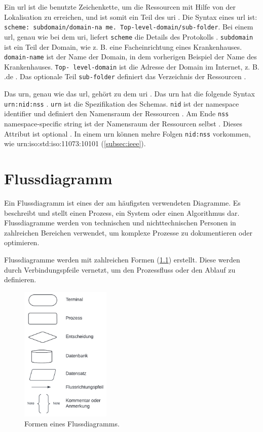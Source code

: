  Ein \acf{url} ist die benutzte Zeichenkette, um die Ressourcen mit Hilfe von der Lokalisation zu erreichen, und ist somit ein Teil des \ac{uri} \cite{uribibdiff2}. Die Syntax eines \ac{url} ist: \texttt{scheme: subdomain/domain-na me. Top-level-domain/sub-folder}. Bei einem \ac{url}, genau wie bei dem \ac{uri}, liefert \texttt{scheme} die Details des Protokolls \cite{uribibdiff}. \texttt{subdomain} ist ein Teil der Domain, wie z. B. eine Facheinrichtung eines Krankenhauses. \texttt{domain-name} ist der Name der Domain, in dem vorherigen Beispiel der Name des Krankenhauses. \texttt{Top- level-domain} ist die Adresse der Domain im Internet, z. B. \glqq .de\grqq{} \cite{uribibdiff}. Das optionale Teil \texttt{sub-folder} definiert das Verzeichnis der Ressourcen \cite{uribibdiff, uribibdiff2}.
 
 Das \acf{urn}, genau wie das \ac{url}, gehört zu dem \ac{uri} \cite{uribibdiff}. Das \ac{urn} hat die folgende Syntax \texttt{urn:nid:nss} \cite{uribibdiff, uribibdiff2}. \texttt{urn} ist die Spezifikation des Schemas. \texttt{nid} ist der \glqq namespace identifier\grqq{} und definiert den Namensraum der Ressourcen \cite{uribibdiff}. Am Ende \texttt{nss} \glqq namespace-specific string\grqq{} ist der Namensraum der Ressourcen selbst \cite{uribibdiff}. Dieses Attribut ist optional \cite{uribibdiff2}. In einem \ac{urn} können mehre Folgen \texttt{nid:nss} vorkommen, wie urn:iso:std:iso:11073:10101 (\ref{subsec:ieee}).

 
 \chapter{Flussdiagramm} \label{sec:flowdiagram}
 
 Ein Flussdiagramm ist eines der am häufigsten verwendeten Diagramme. Es beschreibt und stellt einen Prozess, ein System oder einen Algorithmus dar. Flussdiagramme werden von technischen und nichttechnischen Personen in zahlreichen Bereichen verwendet, um komplexe Prozesse zu dokumentieren oder optimieren.
 
 Flussdiagramme werden mit zahlreichen Formen (\ref{fig:flowdiagramappen}) erstellt. Diese werden durch Verbindungspfeile vernetzt, um den Prozessfluss oder den Ablauf zu definieren.
 
 \begin{figure}[ht]
 	\centering
 	\includegraphics[height=6.5cm]{figures/flowdiagram}
 	\caption[Formen eines Flussdiagramms]{Formen eines Flussdiagramms.}
 	\label{fig:flowdiagramappen}
 \end{figure}

